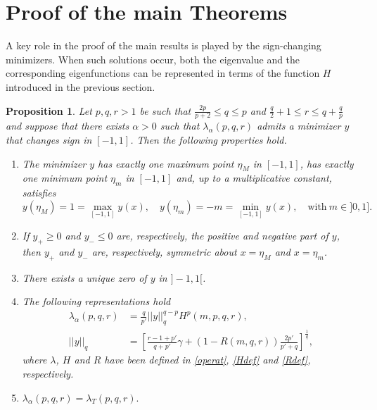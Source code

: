 \documentclass{amsart}
\newtheorem{prop}[thm]{Proposition}
\theoremstyle{definition}
\theoremstyle{remark}
\begin{document}
\section{Proof of the main Theorems}
\label{sec_proof}
A key role in the proof of the main results is played by the sign-changing minimizers. When such solutions occur, both the eigenvalue and the corresponding eigenfunctions can be represented in terms of the function $H$ introduced in the previous section.
\begin{prop}
\label{cambiosegno0}
Let $p,q,r >1$ be such that $\frac{2p}{p+2}\le q\le p$ and $\frac q2+1%
\le r \le %
q+\frac q p$ and suppose that there exists $\alpha>0$ such that $\lambda_\alpha(p,q,r)$ admits a minimizer $y$ that changes sign in $[-1,1]$. Then the following properties hold.
\begin{enumerate}
 \item[{\it (i)}] The minimizer $y$ has exactly one maximum point $\eta_{M}$ in $[-1,1]$, has exactly one minimum point $\eta_{m}$ in $[-1,1]$ and, up to a multiplicative constant, satisfies
\begin{equation}
\label{nor_M_m}
y(\eta_{M})=1=\max_{[-1,1]} y(x),\quad y(\eta_{ m})= -  m=\min_{[-1,1]} y(x),\quad \text{with}\ m\in]0,1].
\end{equation}
 \item[{\it (ii)}] If $y_{+}\ge0$ and $y_{-}\le 0$ are, respectively, the positive and negative part of $y$, then $y_{+}$ and $y_{-}$ are, respectively, symmetric about $x=\eta_{M}$ and $x=\eta_{ m}$.
 \item[{\it (iii)}] There exists a unique zero of $y$ in $]-1,1[$.
 \item[{\it (iv)}] The following representations hold
\[
\begin{split}
\lambda_\alpha(p,q,r)&=\frac q {p' }||y||_q^{q-p}H^p\left(m,p,q,r\right),\\
||y||_q&=\left[\frac{r-1+p'}{q+p'}\gamma+(1-R(m,q,r))\frac{2p'}{p'+q}\right]^\frac 1 q,
\end{split}
\] 
where $\lambda$, $H$ and $R$ have been defined in \eqref{operat}, \eqref{Hdef} and \eqref{Rdef}, respectively.
 \item[{\it (v)}] $
\lambda_\alpha(p,q,r)=\lambda_T(p,q,r).
$ 
\end{enumerate}
\end{prop}
\end{document}
